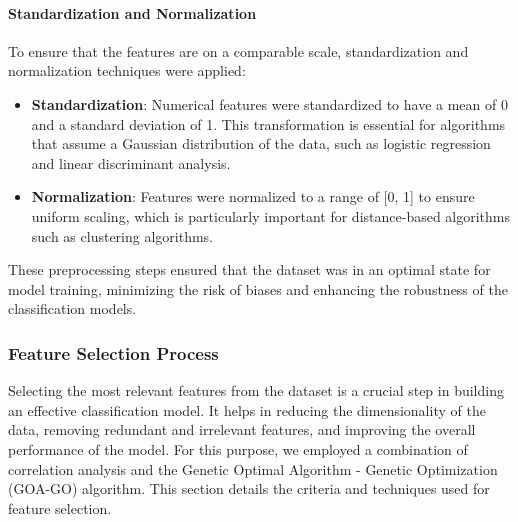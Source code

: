 \paragraph{Standardization and Normalization}
To ensure that the features are on a comparable scale, standardization and normalization techniques were applied:
\begin{itemize}
    \item \textbf{Standardization}: Numerical features were standardized to have a mean of 0 and a standard deviation of 1. This transformation is essential for algorithms that assume a Gaussian distribution of the data, such as logistic regression and linear discriminant analysis.
    \item \textbf{Normalization}: Features were normalized to a range of [0, 1] to ensure uniform scaling, which is particularly important for distance-based algorithms such as clustering algorithms.
\end{itemize}
These preprocessing steps ensured that the dataset was in an optimal state for model training, minimizing the risk of biases and enhancing the robustness of the classification models.
\subsubsection{Feature Selection Process}
Selecting the most relevant features from the dataset is a crucial step in building an effective classification model. It helps in reducing the dimensionality of the data, removing redundant and irrelevant features, and improving the overall performance of the model. For this purpose, we employed a combination of correlation analysis and the Genetic Optimal Algorithm - Genetic Optimization (GOA-GO) \cite{Bakro2024} algorithm. This section details the criteria and techniques used for feature selection.

